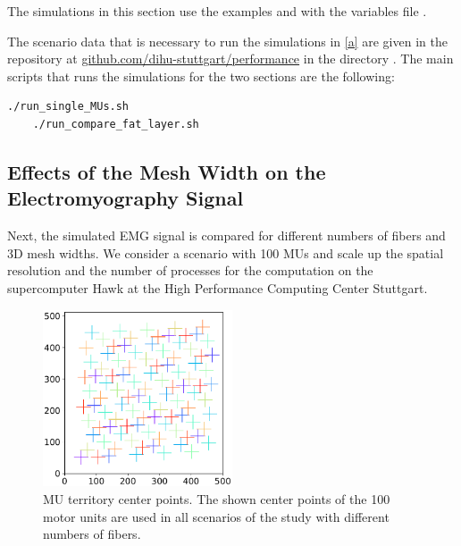 \begin{reproduce}
  The simulations in this section use the examples  and  with the variables file .

  The scenario data that is necessary to run the simulations in \cref{a} are given in the repository at \href{https://github.com/dihu-stuttgart/performance}{github.com/dihu-stuttgart/performance}
  in the directory . The main scripts that runs the simulations for the two sections are the following:
  \begin{lstlisting}[columns=fullflexible,breaklines=true,postbreak=\mbox{\textcolor{gray}{$\hookrightarrow$}\space}]
    ./run_single_MUs.sh
    ./run_compare_fat_layer.sh
  \end{lstlisting}
\end{reproduce}

\subsection{Effects of the Mesh Width on the Electromyography Signal}\label{sec:effects_of_the_mesh_width_emg}

Next, the simulated EMG signal is compared for different numbers of fibers and 3D mesh widths. We consider a scenario with 100 MUs and scale up the spatial resolution and the number of processes for the computation on the supercomputer Hawk at the High Performance Computing Center Stuttgart.

\begin{figure}[H]
  \centering%
  \includegraphics[width=0.5\textwidth]{images/results/application/MU_fibre_distribution_523x523_100mus_txt_mu_positions.pdf}%
  \caption{MU territory center points. The shown center points of the 100 motor units are used in all scenarios of the study with different numbers of fibers.}%
  \label{fig:MU_fibre_distribution_523x523_100mus_txt_mu_positions}%
\end{figure}

